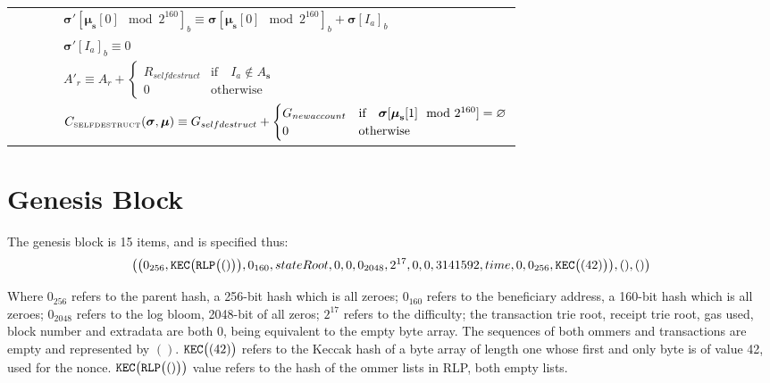 \documentclass[9pt,oneside]{amsart}
\begin{document}
\begin{tabular*}{\columnwidth}[h]{rlrrl}
&&&& $\boldsymbol{\sigma}'[\boldsymbol{\mu}_\mathbf{s}[0] \mod 2^{160}]_b \equiv \boldsymbol{\sigma}[\boldsymbol{\mu}_\mathbf{s}[0] \mod 2^{160}]_b + \boldsymbol{\sigma}[I_a]_b$ \\
&&&& $\boldsymbol{\sigma}'[I_a]_b \equiv 0$ \\
&&&& $A'_{r} \equiv A_{r} + \begin{cases}
R_{selfdestruct} & \text{if} \quad I_a \notin A_\mathbf{s} \\
0 & \text{otherwise}
\end{cases}$ \\
&&&& $C_{\text{\tiny SELFDESTRUCT}}(\boldsymbol{\sigma}, \boldsymbol{\mu}) \equiv G_{selfdestruct} + \begin{cases}
G_{newaccount} & \text{if} \quad \boldsymbol{\sigma}[\boldsymbol{\mu}_\mathbf{s}[1] \mod 2^{160}] = \varnothing \\
0 & \text{otherwise}
\end{cases}$ \\
\bottomrule
\end{tabular*}


\section{Genesis Block}\label{app:genesis}

The genesis block is 15 items, and is specified thus:
\begin{equation}
\big( \big( 0_{256}, \mathtt{\tiny KEC}\big(\mathtt{\tiny RLP}\big( () \big)\big), 0_{160}, stateRoot, 0, 0, 0_{2048}, 2^{17}, 0, 0, 3141592, time, 0, 0_{256},  \mathtt{\tiny KEC}\big( (42) \big) \big), (), () \big)
\end{equation}

Where $0_{256}$ refers to the parent hash, a 256-bit hash which is all zeroes; $0_{160}$ refers to the beneficiary address, a 160-bit hash which is all zeroes; $0_{2048}$ refers to the log bloom, 2048-bit of all zeros; $2^{17}$ refers to the difficulty; the transaction trie root, receipt trie root, gas used, block number and extradata are both $0$, being equivalent to the empty byte array. The sequences of both ommers and transactions are empty and represented by $()$. $\mathtt{\tiny KEC}\big( (42) \big)$ refers to the Keccak hash of a byte array of length one whose first and only byte is of value 42, used for the nonce. $\mathtt{\tiny KEC}\big(\mathtt{\tiny RLP}\big( () \big)\big)$ value refers to the hash of the ommer lists in RLP, both empty lists.
\end{document}
